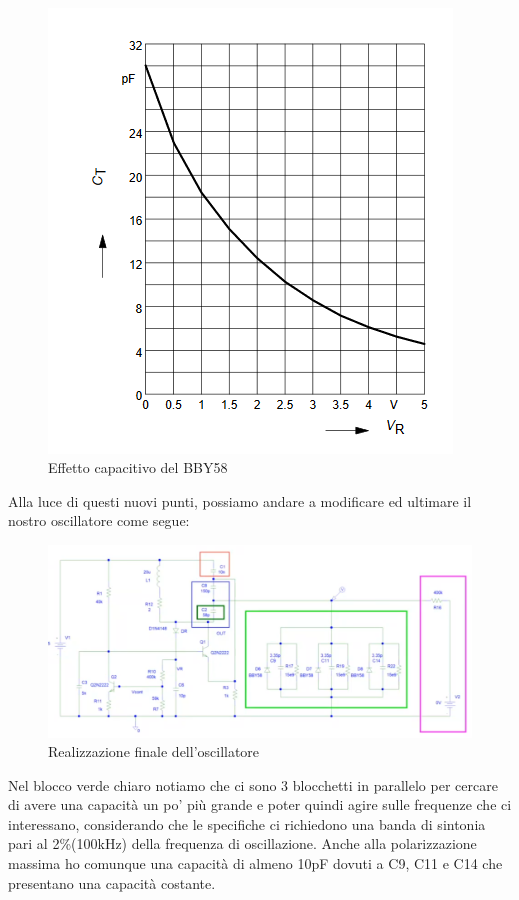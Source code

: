 \documentclass{article}
\begin{document}
~\begin{figure}[H]
\includegraphics[scale=1]{BBY58.png}
\centering
\caption{Effetto capacitivo del BBY58}
\label{fig:foo}
\end{figure}
Alla luce di questi nuovi punti, possiamo andare a modificare ed ultimare il nostro oscillatore come segue:
~\begin{figure}[H]
\includegraphics[width=\textwidth]{UltimoOscillatore.png}
\centering
\caption{Realizzazione finale dell'oscillatore}
\label{fig:foo}
\end{figure}
Nel blocco verde chiaro notiamo che ci sono 3 blocchetti in parallelo per cercare di avere una capacità un po' più grande e poter quindi agire sulle frequenze che ci interessano, considerando che le specifiche ci richiedono una banda di sintonia pari al 2\%(100kHz) della frequenza di oscillazione.
Anche alla polarizzazione massima ho comunque una capacità di almeno 10pF dovuti  a C9, C11 e C14 che presentano una capacità costante.
\end{document}
